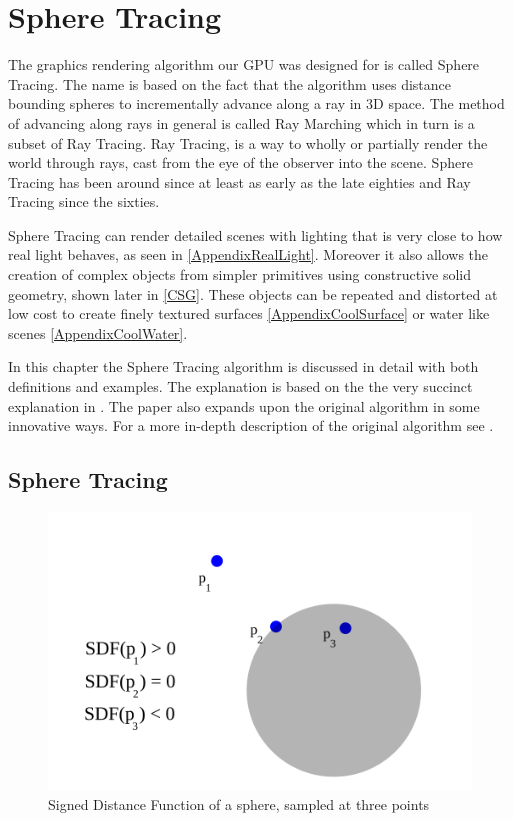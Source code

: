\chapter{Sphere Tracing} \label{spheretracing}

	The graphics rendering algorithm our GPU was designed for is called Sphere
	Tracing\cite{Hart1996}. The name is based on the fact that the algorithm uses
	distance bounding spheres to incrementally advance along a ray in 3D space.
	The method of advancing along rays in general is called Ray Marching which in
	turn is a subset of Ray Tracing\cite{Whitted1980a}. Ray Tracing, is a way to
	wholly or partially render the world through rays, cast from the eye of the
	observer into the scene\cite{PeterShirleyMichaelAshikhmin2005}. Sphere
	Tracing has been around since at least as early as the late
	eighties\cite{Hart1989} and Ray Tracing since the sixties\cite{Appel1968}.

	Sphere Tracing can render detailed scenes with lighting that is very
	close to how real light behaves, as seen in \ref{AppendixRealLight}.
	Moreover it also allows the creation of complex objects from simpler 
	primitives using constructive solid geometry, shown later in \ref{CSG}. 
	These objects can be repeated and distorted at low cost to create finely
	textured surfaces \ref{AppendixCoolSurface} or water like scenes
	\ref{AppendixCoolWater}.

	In this chapter the Sphere Tracing algorithm is discussed in detail with
	both definitions and examples. The explanation is based on the the very
	succinct explanation in \cite{Korndorfer2014}. The paper also expands upon
	the original algorithm in some innovative ways. For a more in-depth
	description of the original algorithm see \cite{Hart1996}.

	\section{Sphere Tracing} 

		\begin{figure}
			\includegraphics[width=0.75\linewidth]{figure/SDF} 
			\caption{Signed Distance Function of a sphere, sampled at three 
				points}
		\end{figure}

